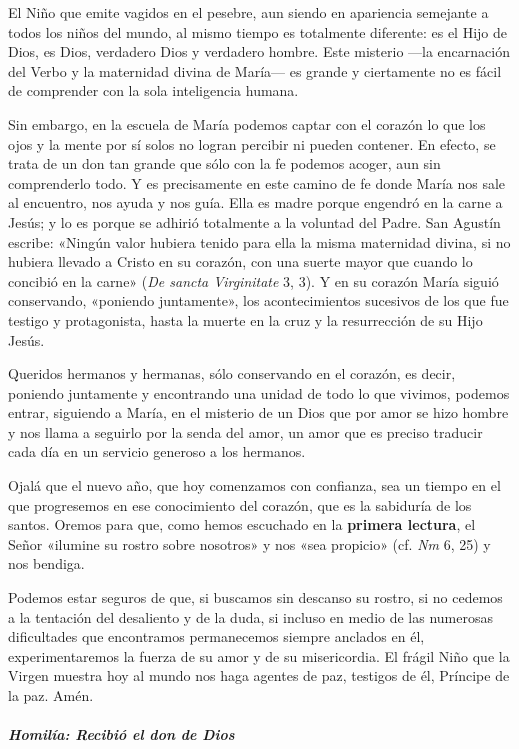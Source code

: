 \documentclass[]{article}
\let\oldsubparagraph\subparagraph
\renewcommand{\subparagraph}[1]{\oldsubparagraph{#1}\mbox{}}
\begin{document}
El Niño que emite vagidos en el pesebre, aun siendo en apariencia
semejante a todos los niños del mundo, al mismo tiempo es totalmente
diferente: es el Hijo de Dios, es Dios, verdadero Dios y verdadero
hombre. Este misterio ---la encarnación del Verbo y la maternidad divina
de María--- es grande y ciertamente no es fácil de comprender con la
sola inteligencia humana.

Sin embargo, en la escuela de María podemos captar con el corazón lo que
los ojos y la mente por sí solos no logran percibir ni pueden contener.
En efecto, se trata de un don tan grande que sólo con la fe podemos
acoger, aun sin comprenderlo todo. Y es precisamente en este camino de
fe donde María nos sale al encuentro, nos ayuda y nos guía. Ella es
madre porque engendró en la carne a Jesús; y lo es porque se adhirió
totalmente a la voluntad del Padre. San Agustín escribe: «Ningún valor
hubiera tenido para ella la misma maternidad divina, si no hubiera
llevado a Cristo en su corazón, con una suerte mayor que cuando lo
concibió en la carne» (\emph{De sancta Virginitate} 3, 3). Y en su
corazón María siguió conservando, «poniendo juntamente», los
acontecimientos sucesivos de los que fue testigo y protagonista, hasta
la muerte en la cruz y la resurrección de su Hijo Jesús.

Queridos hermanos y hermanas, sólo conservando en el corazón, es decir,
poniendo juntamente y encontrando una unidad de todo lo que vivimos,
podemos entrar, siguiendo a María, en el misterio de un Dios que por
amor se hizo hombre y nos llama a seguirlo por la senda del amor, un
amor que es preciso traducir cada día en un servicio generoso a los
hermanos.

Ojalá que el nuevo año, que hoy comenzamos con confianza, sea un tiempo
en el que progresemos en ese conocimiento del corazón, que es la
sabiduría de los santos. Oremos para que, como hemos escuchado en la
\textbf{primera lectura}, el Señor «ilumine su rostro sobre nosotros» y
nos «sea propicio» (cf. \emph{Nm} 6, 25) y nos bendiga.

Podemos estar seguros de que, si buscamos sin descanso su rostro, si no
cedemos a la tentación del desaliento y de la duda, si incluso en medio
de las numerosas dificultades que encontramos permanecemos siempre
anclados en él, experimentaremos la fuerza de su amor y de su
misericordia. El frágil Niño que la Virgen muestra hoy al mundo nos haga
agentes de paz, testigos de él, Príncipe de la paz. Amén.

\subparagraph{Homilía: Recibió el don de
Dios}\label{homiluxeda-recibiuxf3-el-don-de-dios}
\end{document}
